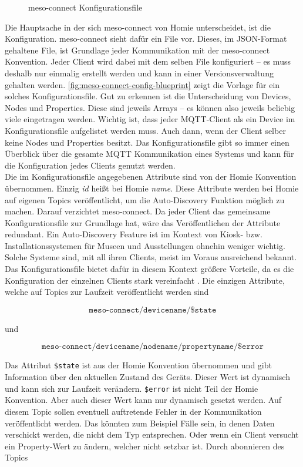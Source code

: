 \begin{figure}
  
  \caption{meso-connect Konfigurationsfile}
  \label{fig:meso-connect-config-blueprint}
\end{figure}

Die Hauptsache in der sich meso-connect von Homie unterscheidet, ist die Konfiguration. meso-connect
sieht dafür ein File vor. Dieses, im JSON-Format gehaltene File, ist Grundlage jeder Kommunikation
mit der meso-connect Konvention. Jeder Client wird dabei mit dem selben File konfiguriert -- es muss 
deshalb nur einmalig erstellt werden und kann in einer Versionsverwaltung gehalten werden. 
\autoref{fig:meso-connect-config-blueprint} zeigt die Vorlage für ein solches Konfigurationsfile. 
Gut zu erkennen ist die Unterscheidung von Devices, Nodes und Properties. Diese sind jeweils Arrays --
es können also jeweils beliebig viele eingetragen werden. Wichtig ist, dass jeder MQTT-Client als ein
Device im Konfigurationsfile aufgelistet werden muss. Auch dann, wenn der Client selber 
keine Nodes und Properties besitzt. Das Konfigurationsfile gibt so immer einen Überblick über die 
gesamte MQTT Kommunikation eines Systems und kann für die Konfiguration jedes Clients genutzt werden.\\
Die im Konfigurationsfile angegebenen Attribute sind von der Homie Konvention übernommen. Einzig \emph{id} heißt
bei Homie \emph{name}. Diese Attribute werden bei Homie auf eigenen Topics veröffentlicht, um die 
Auto-Discovery Funktion möglich zu machen. Darauf verzichtet meso-connect. Da jeder Client das gemeinsame
Konfigurationsfile zur Grundlage hat, wäre das Veröffentlichen der Attribute redundant. Ein Auto-Discovery
Feature ist im Kontext von Kiosk- bzw. Installationssystemen für Museen und Ausstellungen ohnehin weniger wichtig.
Solche Systeme sind, mit all ihren Clients, meist im Voraus ausreichend bekannt. Das Konfigurationsfile
bietet dafür in diesem Kontext größere Vorteile, da es die Konfiguration der einzelnen Clients stark
vereinfacht . Die einzigen Attribute, welche auf Topics zur Laufzeit veröffentlicht 
werden sind

\[\texttt{meso-connect/devicename/\$state} \]

und

\[\texttt{meso-connect/devicename/nodename/propertyname/\$error} \]

Das Attribut \texttt{\$state} ist aus der Homie Konvention übernommen und gibt Information über den aktuellen
Zustand des Geräts. Dieser Wert ist dynamisch und kann sich zur Laufzeit verändern. \texttt{\$error} ist nicht 
Teil der Homie Konvention. Aber auch dieser Wert kann nur dynamisch gesetzt werden.
Auf diesem Topic sollen eventuell auftretende Fehler in der Kommunikation veröffentlicht
werden. Das könnten zum Beispiel Fälle sein, in denen Daten verschickt werden, die nicht dem Typ entsprechen.
Oder wenn ein Client versucht ein Property-Wert zu ändern, welcher nicht setzbar ist. Durch abonnieren 
des Topics

